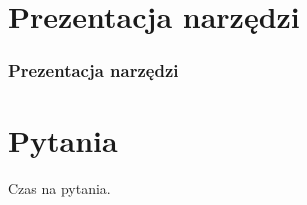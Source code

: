 \documentclass[hyperref={pdfpagelabels=false}]{beamer}
\begin{document}
\section{Prezentacja narzędzi}
\begin{frame}
	\frametitle{Prezentacja narzędzi}
\end{frame}

\section{Pytania}
\begin{frame}
	Czas na pytania.
\end{frame}
\end{document}
